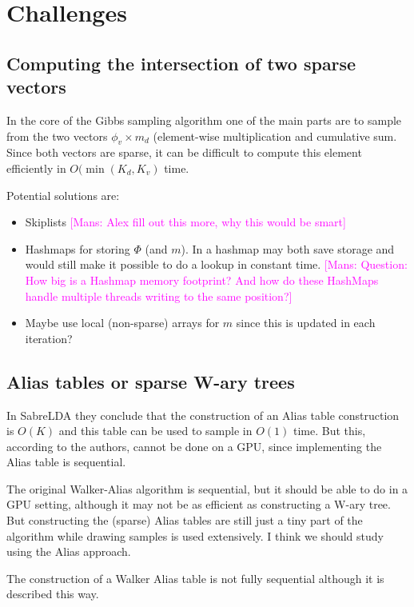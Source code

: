 \documentclass{article}
\newcommand{\mm}[1]{{\textcolor{magenta}{[Mans: #1]}}}
\begin{document}
\section{Challenges}

\subsection{Computing the intersection of two sparse vectors}

In the core of the Gibbs sampling algorithm one of the main parts are to sample from the two vectors $\phi_v \times m_d$ (element-wise multiplication and cumulative sum. Since both vectors are sparse, it can be difficult to compute this element efficiently in $O(\min(K_d, K_v)$ time.

Potential solutions are:

\begin{itemize}
  \item Skiplists \mm{Alex fill out this more, why this would be smart}
  \item Hashmaps for storing $\Phi$ (and $m$). In a hashmap may both save storage and would still make it possible to do a lookup in constant time. \mm{Question: How big is a Hashmap memory footprint? And how do these HashMaps handle multiple threads writing to the same position?}
  \item Maybe use local (non-sparse) arrays for $m$ since this is updated in each iteration?
\end{itemize}

\subsection{Alias tables or sparse W-ary trees}

In SabreLDA they conclude that the construction of an Alias table construction is $O(K)$ and this table can be used to sample in $O(1)$ time. But this, according to the authors, cannot be done on a GPU, since implementing the Alias table is sequential. 

The original Walker-Alias algorithm is sequential, but it should be able to do in a GPU setting, although it may not be as efficient as constructing a W-ary tree. But constructing the (sparse) Alias tables are still just a tiny part of the algorithm while drawing samples is used extensively. I think we should study using the Alias approach.

The construction of a Walker Alias table is not fully sequential although it is described this way. 
\end{document}
